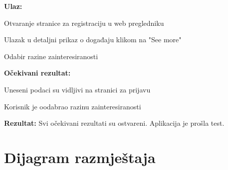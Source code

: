 			\noindent {}
			\begin{packed_item}

				\item  \textbf{Ulaz:}
				\item[] \begin{packed_enum}

					\item Otvaranje stranice za registraciju u web pregledniku
					\item Ulazak u detaljni prikaz o događaju klikom na "See more"
					\item Odabir razine zainteresiranosti

				\end{packed_enum}
				
				\item  \textbf{Očekivani rezultat:}
				\item[] \begin{packed_item}
				\item[1] Uneseni podaci su vidljivi na stranici za prijavu
				\item[2] Korisnik je oodabrao razinu zainteresiranosti
				\end{packed_item}

				\item  \textbf{Rezultat:} Svi očekivani rezultati su ostvareni. Aplikacija je prošla test.
			
			\end{packed_item}
			\eject 
		
		
		\section{Dijagram razmještaja}
			
			
